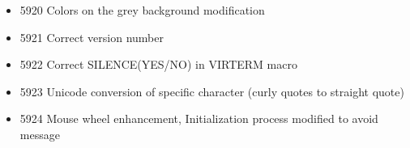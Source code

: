 \documentclass[letterpaper,10pt,english]{sphinxmanual}
\begin{document}
\begin{itemize}
\item {} 
5920 Colors on the grey background modification

\item {} 
5921 Correct version number

\item {} 
5922 Correct SILENCE(YES/NO) in VIRTERM macro

\item {} 
5923 Unicode conversion of specific character (curly quotes to straight quote)

\item {} 
5924 Mouse wheel enhancement, Initialization process modified to avoid message

\end{itemize}



\renewcommand{\indexname}{Index}
\printindex
\end{document}
